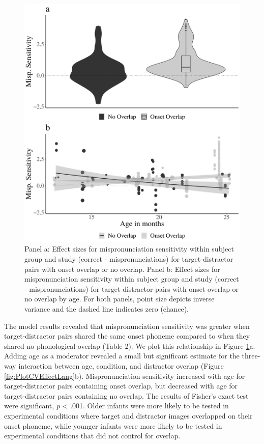 \documentclass[
  man, noextraspace]{apa6}
\begin{document}
\begin{figure}
\centering
\includegraphics{VonHolzenBergmann_MPMetaAnalysis_files/figure-latex/PlotDistOverlap-1.pdf}
\caption{\label{fig:PlotDistOverlap}Panel a: Effect sizes for mispronunciation sensitivity within subject group and study (correct - mispronunciations) for target-distractor pairs with onset overlap or no overlap. Panel b: Effect sizes for mispronunciation sensitivity within subject group and study (correct - mispronunciations) for target-distractor pairs with onset overlap or no overlap by age. For both panels, point size depicts inverse variance and the dashed line indicates zero (chance).}
\end{figure}

The model results revealed that mispronunciation sensitivity was greater when target-distractor pairs shared the same onset phoneme compared to when they shared no phonological overlap (Table 2). We plot this relationship in Figure \ref{fig:PlotDistOverlap}a. Adding age as a moderator revealed a small but significant estimate for the three-way interaction between age, condition, and distractor overlap (Figure \ref{fig:PlotCVEffectLang}b). Mispronunciation sensitivity increased with age for target-distractor pairs containing onset overlap, but decreased with age for target-distractor pairs containing no overlap. The results of Fisher's exact test were significant, \emph{p} \textless{} .001. Older infants were more likely to be tested in experimental conditions where target and distractor images overlapped on their onset phoneme, while younger infants were more likely to be tested in experimental conditions that did not control for overlap.
\end{document}
